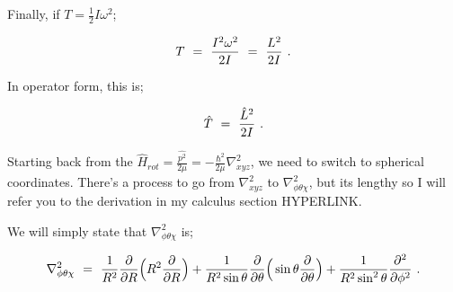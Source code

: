 \documentclass{article}
\begin{document}
Finally, if \begin{math} T = \frac{1}{2} I \omega^{2} \end{math};

\begin{equation} \label{eb-eq-256-43}
T \hspace{0.125cm} = \hspace{0.125cm} \frac{I^2 \omega^{2}}{2 I} \hspace{0.125cm} = \hspace{0.125cm} \frac{L^2}{2I} \hspace{0.125cm} .
\end{equation}

In operator form, this is;

\begin{equation} \label{eb-eq-256-44}
\hat{T} \hspace{0.125cm} = \hspace{0.125cm} \frac{\hat{L}^2}{2I} \hspace{0.125cm} .
\end{equation}

Starting back from the \begin{math} \hat{H}_{rot} = \frac{\hat{p^{2}}}{2 \mu} = -\frac{\hbar^{2}}{2 \mu} \nabla_{xyz}^{2} \end{math}, we need to switch to spherical coordinates. There's a process to go from \begin{math} \nabla_{xyz}^{2} \end{math} to \begin{math} \nabla_{\phi \theta \chi}^{2} \end{math}, but its lengthy so I will refer you to the derivation in my calculus section HYPERLINK. 

We will simply state that \begin{math} \nabla_{\phi \theta \chi}^{2} \end{math} is;

\begin{equation} \label{eb-eq-256-45}
\nabla_{\phi \theta \chi}^{2} \hspace{0.125cm} = \hspace{0.125cm} \frac{1}{R^2}\frac{\partial}{\partial{R}}\Big( R^2 \frac{\partial}{\partial{R}}\Big) + \frac{1}{R^2 \sin{\theta}}\frac{\partial}{\partial{\theta}}\Big(\sin{\theta}\frac{\partial}{\partial{\theta}}\Big) + \frac{1}{R^2 \sin^{2}{\theta}}\frac{\partial^{2}}{\partial{\phi}^{2}} \hspace{0.125cm} .
\end{equation}
\end{document}

